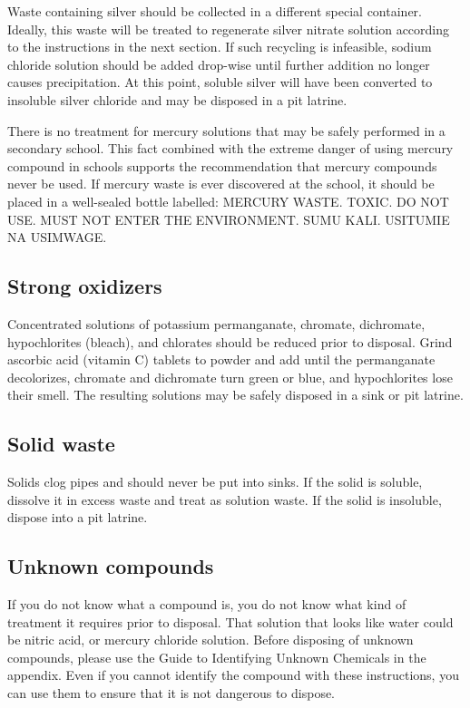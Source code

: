 Waste containing silver should be collected in a different special container. 
Ideally, this waste will be treated to regenerate silver nitrate solution 
according to the instructions in the next section. 
If such recycling is infeasible, 
sodium chloride solution should be added drop-wise 
until further addition no longer causes precipitation. 
At this point, soluble silver will have been converted 
to insoluble silver chloride and may be disposed in a pit latrine.

There is no treatment for mercury solutions 
that may be safely performed in a secondary school. 
This fact combined with the extreme danger 
of using mercury compound in schools 
supports the recommendation that mercury compounds never be used. 
If mercury waste is ever discovered at the school, 
it should be placed in a well-sealed bottle labelled: 
MERCURY WASTE. 
TOXIC. 
DO NOT USE. 
MUST NOT ENTER THE ENVIRONMENT. 
SUMU KALI. 
USITUMIE NA USIMWAGE.

\subsection{Strong oxidizers}
Concentrated solutions of potassium permanganate, 
chromate, dichromate, hypochlorites (bleach), and chlorates 
should be reduced prior to disposal. 
Grind ascorbic acid (vitamin C) tablets to powder 
and add until the permanganate decolorizes, 
chromate and dichromate turn green or blue, and hypochlorites lose their smell. 
The resulting solutions may be safely disposed in a sink or pit latrine.

\subsection{Solid waste}
Solids clog pipes and should never be put into sinks. 
If the solid is soluble, dissolve it in excess waste 
and treat as solution waste. 
If the solid is insoluble, dispose into a pit latrine.

\subsection{Unknown compounds}
If you do not know what a compound is, 
you do not know what kind of treatment it requires prior to disposal. 
That solution that looks like water could be nitric acid, 
or mercury chloride solution. 
Before disposing of unknown compounds, 
please use the Guide to Identifying Unknown Chemicals in the appendix. 
Even if you cannot identify the compound with these instructions, 
you can use them to ensure that it is not dangerous to dispose.
